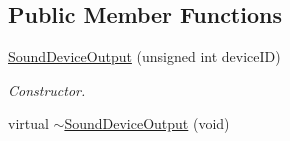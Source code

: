 \subsection*{Public Member Functions}
\begin{DoxyCompactItemize}
\item 
\hyperlink{class_sound_device_output_af9fb5a0083b077466d9e7b060f9b6018}{SoundDeviceOutput} (unsigned int deviceID)
\begin{DoxyCompactList}\small\item\em Constructor. \item\end{DoxyCompactList}\item 
\hypertarget{class_sound_device_output_aa37e67f35ee69b80e2df2cf5050a114f}{
virtual \hyperlink{class_sound_device_output_aa37e67f35ee69b80e2df2cf5050a114f}{$\sim$SoundDeviceOutput} (void)}
\label{class_sound_device_output_aa37e67f35ee69b80e2df2cf5050a114f}


\end{DoxyCompactItemize}
